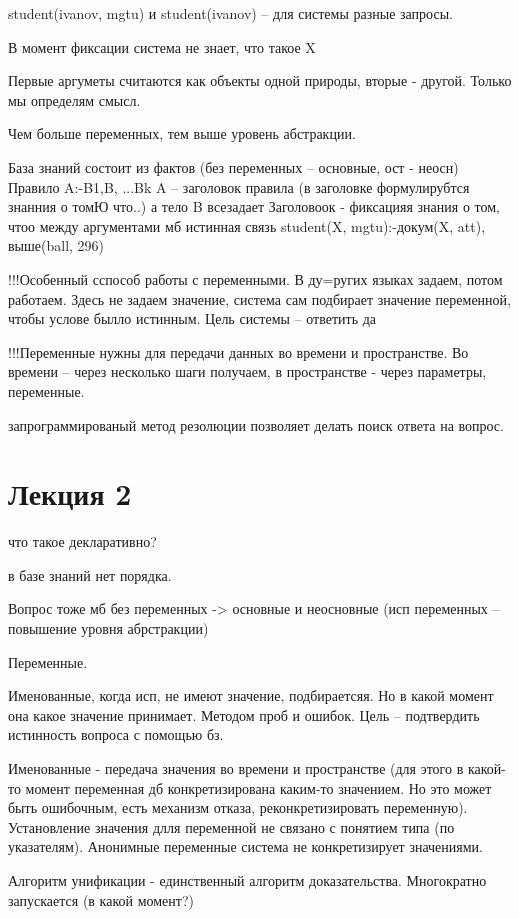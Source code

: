 \documentclass[12pt]{report}
\begin{document}
student(ivanov, mgtu) и student(ivanov) -- для системы разные запросы.

В момент фиксации система не знает, что такое X


Первые аргуметы считаются как объекты одной природы, вторые - другой. Только мы определям смысл.

Чем больше переменных, тем выше уровень абстракции.

База знаний состоит из фактов (без переменных -- основные, ост - неосн)
Правило
A:-B1,B, ...Bk
A -- заголовок правила (в заголовке формулирубтся знанния о томЮ что..) а тело B всезадает 
Заголовоок - фиксацияя знания о том, чтоо между аргументами мб истинная связь
student(X, mgtu):-докум(X, att), выше(ball, 296)

!!!Особенный сспособ работы с переменными. В ду=ругих языках задаем, потом работаем. Здесь не задаем значение, система сам подбирает значение переменной, чтобы услове былло истинным.  Цель системы -- ответить да

!!!Переменные нужны для передачи данных во времени и пространстве.  Во времени -- через несколько шаги получаем, в пространстве - через параметры, переменные.

запрограммированый метод резолюции позволяет делать поиск ответа на вопрос.

\chapter*{Лекция 2}

что такое декларативно?

в базе знаний нет порядка.

Вопрос тоже мб без переменных -> основные и неосновные (исп переменных -- повышение уровня абрстракции)

Переменные.

Именованные, когда исп, не имеют значение, подбираетсяя. Но в какой момент она какое значение принимает. Методом проб и ошибок. Цель -- подтвердить истинность вопроса с помощью бз. 


Именованные - передача значения во времени и пространстве (для этого в какой-то момент переменная дб конкретизирована каким-то значением. Но это может  быть ошибочным, есть механизм отказа, реконкретизировать переменную). Установление значения длля переменной не связано с понятием типа  (по указателям). Анонимные переменные система не конкретизирует значениями.

Алгоритм унификации - единственный алгоритм доказательства. Многократно запускается (в какой момент?)
\end{document}
